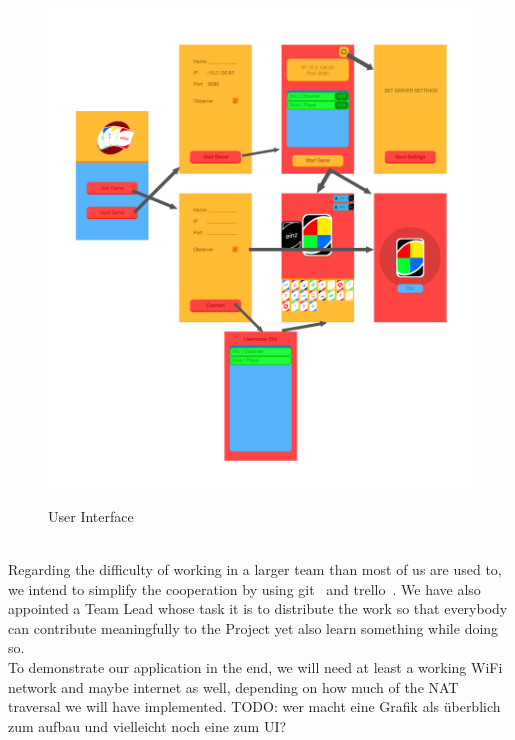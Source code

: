 \documentclass{report}
\newcommand{\lfig}[1]{\label{fig:#1}}
\begin{document}
\begin{figure}[h]
	\centering
    \includegraphics[width=\columnwidth]{Artboard.png}
    \lfig{nat}
    \vspace{-5mm} %
	\caption{User Interface}
\end{figure}
\\

Regarding the difficulty of working in a larger team than most of us are used to, we intend to simplify the cooperation by using git~\cite{github} and trello~\cite{trello}. We have also appointed a Team Lead whose task it is to distribute the work so that everybody can contribute meaningfully to the Project yet also learn something while doing so.\\

To demonstrate our application in the end, we will need at least a working WiFi network and maybe internet as well, depending on how much of the NAT traversal we will have implemented.
\newline
\newline
TODO: wer macht eine Grafik als überblich zum aufbau und vielleicht noch eine zum UI?
\end{document}

